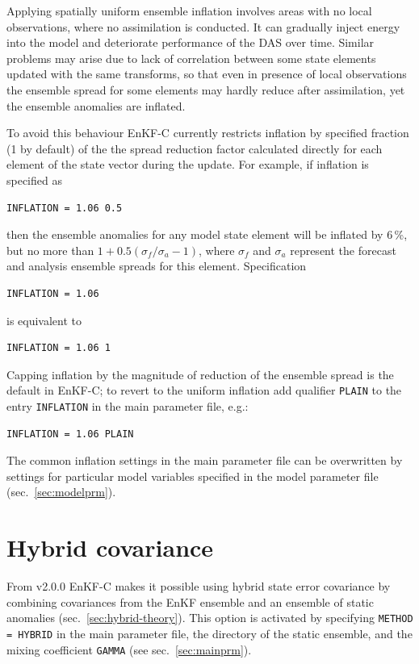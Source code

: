 \documentclass[11pt]{report}
\begin{document}
Applying spatially uniform ensemble inflation involves areas with no local observations, where no assimilation is conducted.
It can gradually inject energy into the model and deteriorate performance of the DAS over time.
Similar problems may arise due to lack of correlation between some state elements updated with the same transforms, so that even in presence of local observations the ensemble spread for some elements may hardly reduce after assimilation, yet the ensemble anomalies are inflated.

To avoid this behaviour EnKF-C currently restricts inflation by specified fraction (1 by default) of the the spread reduction factor calculated directly for each element of the state vector during the update.
For example, if inflation is specified as
\begin{Verbatim}
INFLATION = 1.06 0.5
\end{Verbatim}
then the ensemble anomalies for any model state element will be inflated by 6\,\%, but no more than $1 + 0.5 (\sigma_f / \sigma_a - 1)$, where $\sigma_f$ and $\sigma_a$ represent the forecast and analysis ensemble spreads for this element.
Specification
\begin{Verbatim}
INFLATION = 1.06
\end{Verbatim}
is equivalent to
\begin{Verbatim}
INFLATION = 1.06 1
\end{Verbatim}
Capping inflation by the magnitude of reduction of the ensemble spread is the default in EnKF-C; to revert to the uniform inflation add qualifier \verb|PLAIN| to the entry \verb|INFLATION| in the main parameter file, e.g.:
\begin{Verbatim}
INFLATION = 1.06 PLAIN
\end{Verbatim}
The common inflation settings in the main parameter file can be overwritten by settings for particular model variables specified in the model parameter file (sec.~\ref{sec:modelprm}).

\section{Hybrid covariance}
\label{sec:hybrid-enkfc}

From v2.0.0 EnKF-C makes it possible using hybrid state error covariance by combining covariances from the EnKF ensemble and an ensemble of static anomalies (sec.~\ref{sec:hybrid-theory}).
This option is activated by specifying \verb|METHOD = HYBRID| in the main parameter file, the directory of the static ensemble, and the mixing coefficient \verb|GAMMA| (see sec.~\ref{sec:mainprm}).
\end{document}
